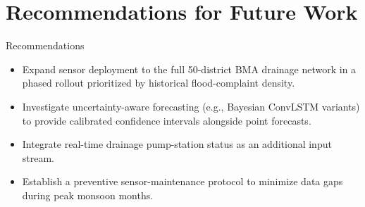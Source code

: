 \section{Recommendations for Future Work}
\begin{chulabox}{Recommendations}
\begin{itemize}[leftmargin=1.4em]
  \item Expand sensor deployment to the full 50-district BMA drainage network in a phased rollout prioritized by historical flood-complaint density.
  \item Investigate uncertainty-aware forecasting (e.g., Bayesian ConvLSTM variants) to provide calibrated confidence intervals alongside point forecasts.
  \item Integrate real-time drainage pump-station status as an additional input stream.
  \item Establish a preventive sensor-maintenance protocol to minimize data gaps during peak monsoon months.
\end{itemize}
\end{chulabox}

